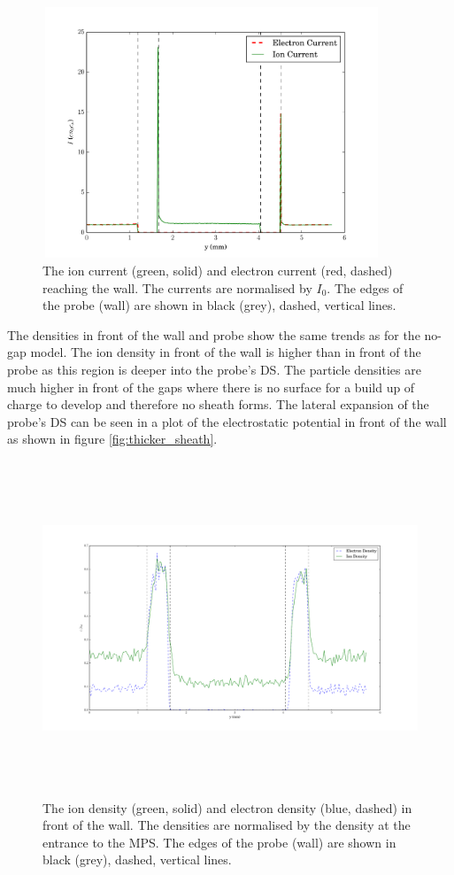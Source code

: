 \begin{figure}[H]
	\centering
	\includegraphics[width=0.9\textwidth, height = 7.5cm]{both_fluxes_gap.pdf}
	\caption{The ion current (green, solid) and electron current (red, dashed) reaching the wall. The currents are normalised by $I_0$. The edges of the probe (wall) are shown in black (grey),  dashed, vertical lines. }
	\label{fig:fluxes_gap}
\end{figure}

The densities in front of the wall and probe show the same trends as for the no-gap model. The ion density in front of the wall is higher than in front of the probe as this region is deeper into the probe's DS. The particle densities are much higher in front of the gaps where there is no surface for a build up of charge to develop and therefore no sheath forms. The lateral expansion of the probe's DS can be seen in a plot of the electrostatic potential in front of the wall as shown in figure \ref{fig:thicker_sheath}.

\begin{figure}[H]
	\centering
	\includegraphics[width=\textwidth, height = 10cm]{density_in_front_of_wall_gap.pdf}
	\caption{The ion density (green, solid) and electron density (blue, dashed) in front of the wall. The densities are normalised by the density at the entrance to the MPS. The edges of the probe (wall) are shown in black (grey),  dashed, vertical lines.   }
	\label{fig:density_y_gap}
\end{figure}



